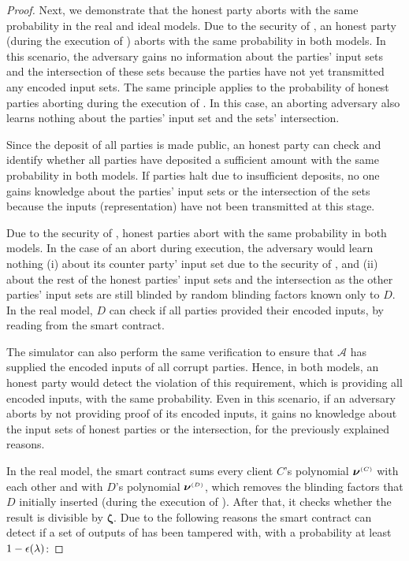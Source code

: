 \begin{proof}
Next, we demonstrate that the honest party aborts with the same probability in the real and ideal models. Due to the security of \ct, an honest party (during the execution of \ct) aborts with the same probability in both models. 
%
In this scenario, the adversary gains no information about the parties' input sets and the intersection of these sets because the parties have not yet transmitted any encoded input sets. The same principle applies to the probability of honest parties aborting during the execution of \zspaa.  In this case, an aborting adversary also learns nothing about the parties' input set and the sets' intersection. 

Since the deposit of all parties is made public, an honest party can check and identify whether all parties have deposited a sufficient amount with the same probability in both models. If parties halt due to insufficient deposits, no one gains knowledge about the parties' input sets or the intersection of the sets because the inputs (representation) have not been transmitted at this stage.


Due to the security of \vopr, honest parties abort with the same probability in both models. In the case of an abort during \vopr execution, the adversary would learn nothing (i) about its counter party' input set due to the security of \vopr, and (ii) about the rest of the honest parties' input sets and the intersection as the other parties' input sets are still blinded by random blinding factors known only to $D$. In the real model, $D$ can check if all parties provided their encoded inputs, by reading from the smart contract.  

The simulator can also perform the same verification to ensure that  $\mathcal{A}$ has supplied the encoded inputs of all corrupt parties. Hence, in both models, an honest party would detect the violation of this requirement, which is providing all encoded inputs, with the same probability. Even in this scenario, if an adversary aborts by not providing proof of its encoded inputs, it gains no knowledge about the input sets of honest parties or the intersection, for the previously explained reasons.


In the real model, the smart contract sums every client $C$'s polynomial $\bm\nu^{ \scriptscriptstyle {  {(C)}} }$ with each other and with $D$'s polynomial $\bm\nu^{ \scriptscriptstyle {  {(D)}} }$, which removes the blinding factors that $D$ initially inserted (during the execution of \vopr). After that, it checks whether the result is divisible by  $\bm \zeta$. 
%
Due to the following reasons the smart contract can detect if a set of outputs of \vopr has been tampered with, with a probability at least $1-\epsilon(\lambda)$:


\end{proof}
